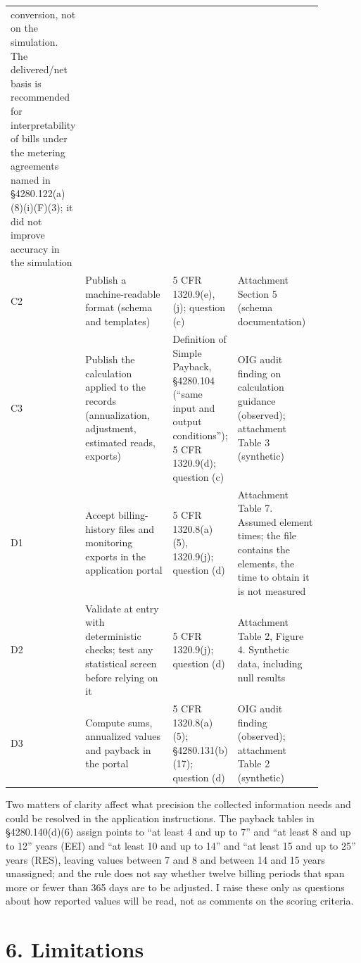 \documentclass[11pt]{article}
\begin{document}
{\begin{longtable}{p{0.05\linewidth}p{0.33\linewidth}p{0.2\linewidth}p{0.3\linewidth}}
conversion, not on the simulation. The delivered/net basis is recommended for
interpretability of bills under the metering agreements named in
\S4280.122(a)(8)(i)(F)(3); it did not improve accuracy in the simulation \\
C2 & Publish a machine-readable format (schema and templates) & 5 CFR 1320.9(e), (j);
question (c) & Attachment Section 5 (schema documentation) \\
C3 & Publish the calculation applied to the records (annualization, adjustment,
estimated reads, exports) & Definition of Simple Payback, \S4280.104
(``same input and output conditions''); 5 CFR 1320.9(d); question (c) & OIG audit
finding on calculation guidance (observed); attachment Table 3 (synthetic) \\
D1 & Accept billing-history files and monitoring exports in the application portal &
5 CFR 1320.8(a)(5), 1320.9(j); question (d) & Attachment Table 7. Assumed element
times; the file contains the elements, the time to obtain it is not measured \\
D2 & Validate at entry with deterministic checks; test any statistical screen before
relying on it &
5 CFR 1320.9(j); question (d) & Attachment Table 2, Figure 4. Synthetic data, including
null results \\
D3 & Compute sums, annualized values and payback in the portal & 5 CFR 1320.8(a)(5);
\S4280.131(b)(17); question (d) & OIG audit finding (observed); attachment Table 2
(synthetic) \\
\hline
\end{longtable}
}

Two matters of clarity affect what precision the collected information needs and could
be resolved in the application instructions. The payback tables in \S4280.140(d)(6)
assign points to ``at least 4 and up to 7'' and ``at least 8 and up to 12'' years (EEI)
and ``at least 10 and up to 14'' and ``at least 15 and up to 25'' years (RES), leaving
values between 7 and 8 and between 14 and 15 years unassigned; and the rule does not
say whether twelve billing periods that span more or fewer than 365 days are to be
adjusted. I raise these only as questions about how reported values will be read, not
as comments on the scoring criteria.

\section*{6. Limitations}
\end{document}
